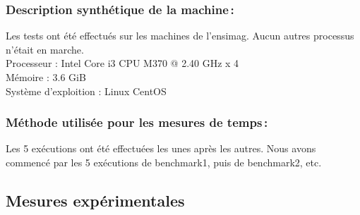 \documentclass[a4paper, 10pt, french]{article}
\begin{document}
    \subsubsection{Description synthétique de la machine\,:} 
	Les tests ont été effectués sur les  machines de l'ensimag. Aucun autres processus n'était en marche.\\
Processeur  : Intel Core i3 CPU M370 @ 2.40 GHz x 4\\
Mémoire : 3.6 GiB\\
Système d'exploition : Linux CentOS

    \subsubsection{Méthode utilisée pour les mesures de temps\,: } 
	Les 5 exécutions ont été effectuées les unes après les autres. Nous avons commencé par les 5 exécutions de benchmark1, puis de benchmark2, etc.

  \subsection{Mesures expérimentales}
\end{document}
